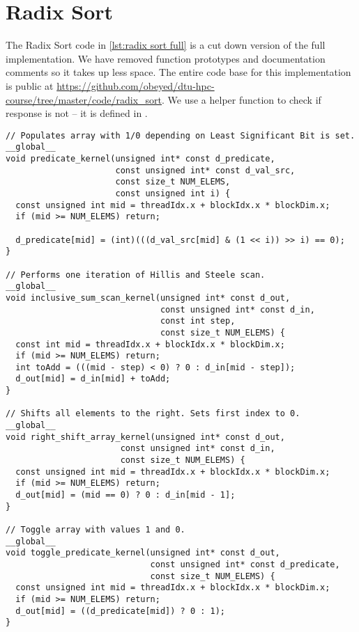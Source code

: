 \chapter{Radix Sort}
\label{ap:radix sort}

The Radix Sort code in \cref{lst:radix sort full} is a cut down version of the full implementation.
We have removed function prototypes and documentation comments so it takes up less space.
The entire code base for this implementation is public at \href{https://github.com/obeyed/dtu-hpc-course/tree/master/code/radix\_sort}{https://github.com/obeyed/dtu-hpc-course/tree/master/code/radix\_sort}.
We use a helper function  to check if response is not  -- it is defined in .

\begin{lstlisting}[captionpos=t, xleftmargin=0.0pt, xrightmargin=0.0pt, caption={Radix Sort implementation}, label={lst:radix sort full}]
// Populates array with 1/0 depending on Least Significant Bit is set.
__global__
void predicate_kernel(unsigned int* const d_predicate,
                      const unsigned int* const d_val_src,
                      const size_t NUM_ELEMS,
                      const unsigned int i) {
  const unsigned int mid = threadIdx.x + blockIdx.x * blockDim.x;
  if (mid >= NUM_ELEMS) return;

  d_predicate[mid] = (int)(((d_val_src[mid] & (1 << i)) >> i) == 0);
}

// Performs one iteration of Hillis and Steele scan.
__global__
void inclusive_sum_scan_kernel(unsigned int* const d_out,
                               const unsigned int* const d_in,
                               const int step,
                               const size_t NUM_ELEMS) {
  const int mid = threadIdx.x + blockIdx.x * blockDim.x;
  if (mid >= NUM_ELEMS) return;
  int toAdd = (((mid - step) < 0) ? 0 : d_in[mid - step]);
  d_out[mid] = d_in[mid] + toAdd;
}

// Shifts all elements to the right. Sets first index to 0.
__global__
void right_shift_array_kernel(unsigned int* const d_out,
                       const unsigned int* const d_in,
                       const size_t NUM_ELEMS) {
  const unsigned int mid = threadIdx.x + blockIdx.x * blockDim.x;
  if (mid >= NUM_ELEMS) return;
  d_out[mid] = (mid == 0) ? 0 : d_in[mid - 1];
}

// Toggle array with values 1 and 0.
__global__
void toggle_predicate_kernel(unsigned int* const d_out, 
                             const unsigned int* const d_predicate,
                             const size_t NUM_ELEMS) {
  const unsigned int mid = threadIdx.x + blockIdx.x * blockDim.x;
  if (mid >= NUM_ELEMS) return;
  d_out[mid] = ((d_predicate[mid]) ? 0 : 1);
}


\end{lstlisting}
